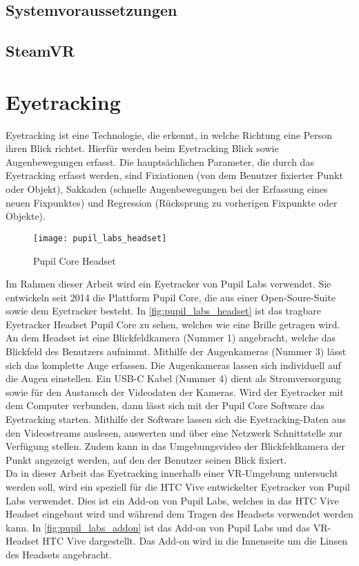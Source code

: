 \subsection{Systemvoraussetzungen}

\subsection{SteamVR}

\section{Eyetracking}
Eyetracking ist eine Technologie, die erkennt, in welche Richtung eine Person ihren Blick richtet. Hierfür werden beim Eyetracking Blick sowie Augenbewegungen erfasst. Die hauptsächlichen Parameter, die durch das Eyetracking erfasst werden, sind Fixiationen (von dem Benutzer fixierter Punkt oder Objekt), Sakkaden (schnelle Augenbewegungen bei der Erfassung eines neuen Fixpunktes) und Regression (Rücksprung zu vorherigen Fixpunkte oder Objekte).

\begin{figure}[!htbp]
	\centering
	\texttt{[image: pupil\_labs\_headset]}
	\caption[Pupil Core Headset]{Pupil Core Headset \cite{PupilLabsHW}}
	\label{fig:pupil_labs_headset}
\end{figure}

Im Rahmen dieser Arbeit wird ein Eyetracker von Pupil Labs verwendet. Sie entwickeln seit 2014 die Plattform Pupil Core, die aus einer Open-Soure-Suite sowie dem Eyetracker besteht. In \autoref{fig:pupil_labs_headset} ist das tragbare Eyetracker Headset Pupil Core zu sehen, welches wie eine Brille getragen wird. An dem Headset ist eine Blickfeldkamera (Nummer 1) angebracht, welche das Blickfeld des Benutzers aufnimmt.  Mithilfe der Augenkameras (Nummer 3) lässt sich das komplette Auge erfassen. Die Augenkameras lassen sich individuell auf die Augen einstellen. Ein USB-C Kabel (Nummer 4) dient als Stromversorgung sowie für den Austausch der Videodaten der Kameras. Wird der Eyetracker mit dem Computer verbunden, dann lässt sich mit der Pupil Core Software das Eyetracking starten. Mithilfe der Software lassen sich die Eyetracking-Daten aus den Videostreams auslesen, auswerten und über eine Netzwerk Schnittstelle zur Verfügung stellen. Zudem kann in das Umgebungsvideo der Blickfeldkamera der Punkt angezeigt werden, auf den der Benutzer seinen Blick fixiert. \\
Da in dieser Arbeit das Eyetracking innerhalb einer \ac{VR}-Umgebung untersucht werden soll, wird ein speziell für die HTC Vive entwickelter Eyetracker von Pupil Labs verwendet. Dies ist ein Add-on von Pupil Labs, welches in das HTC Vive Headset eingebaut wird und während dem Tragen des Headsets verwendet werden kann. In \autoref{fig:pupil_labs_addon} ist das Add-on von Pupil Labs und das \ac{VR}-Headset HTC Vive dargestellt. Das Add-on wird in die Innenseite um die Linsen des Headsets angebracht. 

